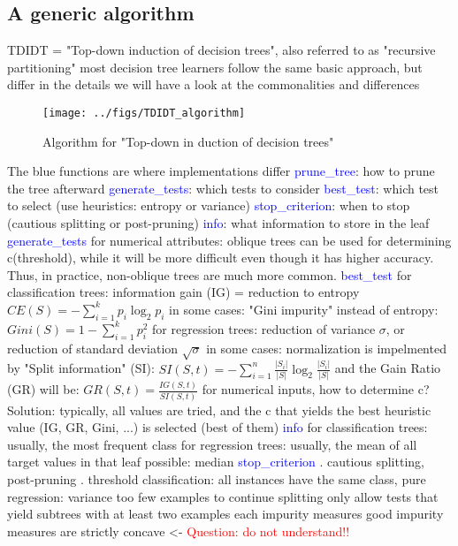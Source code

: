 \subsection{A generic algorithm}
\begin{outline}
    \1 TDIDT = "Top-down induction of decision trees", also referred to as "recursive partitioning"
    \1 most decision tree learners follow the same basic approach, but differ in the details
        \2 we will have a look at the commonalities and differences
\end{outline}
\begin{figure}[htbp]
    \centering
    \texttt{[image: ../figs/TDIDT\_algorithm]}
    \caption{Algorithm for "Top-down in duction of decision trees"}
    \label{fig:tdidt_algorithm}
\end{figure}
\begin{outline}
    \1 The blue functions are where implementations differ
        \2 \textcolor{blue}{prune\_tree}: how to prune the tree afterward
        \2 \textcolor{blue}{generate\_tests}: which tests to consider
        \2 \textcolor{blue}{best\_test}: which test to select (use heuristics: entropy or variance)
        \2 \textcolor{blue}{stop\_criterion}: when to stop (cautious splitting or post-pruning)
        \2 \textcolor{blue}{info}: what information to store in the leaf
    \1 \textcolor{blue}{generate\_tests}
        \2 for numerical attributes: oblique trees can be used for determining c(threshold), while it will be more difficult even though it has higher accuracy. Thus, in practice, non-oblique trees are much more common.
    \1 \textcolor{blue}{best\_test}
        \2 for classification trees: information gain (IG) = reduction to entropy $CE(S) = - \sum_{i=1}^{k} p_{i} \log_{2}{p_{i}}$
            \3 in some cases: "Gini impurity" instead of entropy: $Gini(S) = 1 - \sum_{i=1}^{k} p_{i}^{2}$
        \2 for regression trees: reduction of variance $\sigma$, or reduction of standard deviation $\sqrt{\sigma}$
            \3 in some cases: normalization is impelmented by "Split information" (SI): $SI(S,t) = - \sum_{i=1}^{n} \frac{|S_{i}|}{|S|} \log_{2}{\frac{|S_{i}|}{|S|}}$
            \3 and the Gain Ratio (GR) will be: $GR(S,t) = \frac{IG(S,t)}{SI(S,t)}$
        \2 for numerical inputs, how to determine c?
            \3 Solution: typically, all values are tried, and the c that yields the best heuristic value (IG, GR, Gini, ...) is selected (best of them)
    \1 \textcolor{blue}{info}
        \2 for classification trees: usually, the most frequent class
        \2 for regression trees: usually, the mean of all target values in that leaf
            \3 possible: median
    \1 \textcolor{blue}{stop\_criterion}
        . cautious splitting, post-pruning
        . threshold
            \3 classification: all instances have the same class, pure
            \3 regression: variance 
        \2 too few examples to continue splitting
            \3 only allow tests that yield subtrees with at least two examples each
    \1 impurity measures
        \2 good impurity measures are strictly concave <- \textcolor{red}{Question: do not understand!!}
\end{outline}

